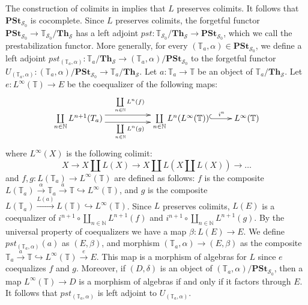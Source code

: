\documentclass[reqno]{amsart}
\theoremstyle{definition}
\theoremstyle{remark}
\newcommand{\cat}[1]{\mathbf{#1}}
\newcommand{\Th}{\cat{Th}}
\newcommand{\PSt}{\cat{PSt}}
\numberwithin{figure}{section}
\begin{document}
The construction of colimits in  implies that $L$ preserves colimits.
It follows that $\PSt_{\mathcal{S}_0}$ is cocomplete.
Since $L$ preserves colimits, the forgetful functor $\PSt_{\mathcal{S}_0} \to \mathbb{T}_{\mathcal{S}_0}/\Th_\mathcal{S}$
has a left adjoint $pst : \mathbb{T}_{\mathcal{S}_0}/\Th_\mathcal{S} \to \PSt_{\mathcal{S}_0}$, which we call the prestabilization functor.
More generally, for every $(\mathbb{T}_a,\alpha) \in \PSt_{\mathcal{S}_0}$,
we define a left adjoint $pst_{(\mathbb{T}_a,\alpha)} : \mathbb{T}_a/\Th_{\mathcal{S}} \to (\mathbb{T}_a,\alpha)/\PSt_{\mathcal{S}_0}$
to the forgetful functor $U_{(\mathbb{T}_a,\alpha)} : (\mathbb{T}_a,\alpha)/\PSt_{\mathcal{S}_0} \to \mathbb{T}_a/\Th_{\mathcal{S}}$.
Let $a : \mathbb{T}_a \to \mathbb{T}$ be an object of $\mathbb{T}_a/\Th_{\mathcal{S}}$.
Let $e : L^\infty(\mathbb{T}) \to E$ be the coequalizer of the following maps:
\[ \xymatrix{ \coprod\limits_{n \in \mathbb{N}} L^{n+1}(T_a) \ar@<+1ex>[rr]^{\coprod\limits_{n \in \mathbb{N}} L^n(f)} \ar@<-1ex>[rr]_{\coprod\limits_{n \in \mathbb{N}} L^n(g)}
    & & \coprod\limits_{n \in \mathbb{N}} L^n(L^\infty(\mathbb{T})) \ar@{^{(}->}[r]^-{i^n} & L^\infty(\mathbb{T}) } \]
where $L^\infty(X)$ is the following colimit:
\[ X \to X \amalg L(X) \to X \amalg L(X \amalg L(X)) \to \ldots \]
and $f,g : L(\mathbb{T}_a) \to L^\infty(\mathbb{T})$ are defined as follows:
$f$ is the composite $L(\mathbb{T}_a) \xrightarrow{\alpha} \mathbb{T}_a \xrightarrow{a} \mathbb{T} \hookrightarrow L^\infty(\mathbb{T})$,
and $g$ is the composite $L(\mathbb{T}_a) \xrightarrow{L(a)} L(\mathbb{T}) \hookrightarrow L^\infty(\mathbb{T})$.
Since $L$ preserves colimits, $L(E)$ is a coequalizer of $i^{n+1} \circ \coprod_{n \in \mathbb{N}} L^{n+1}(f)$ and $i^{n+1} \circ \coprod_{n \in \mathbb{N}} L^{n+1}(g)$.
By the universal property of coequalizers we have a map $\beta : L(E) \to E$.
We define $pst_{(\mathbb{T}_a,\alpha)}(a)$ as $(E,\beta)$, and morphism $(\mathbb{T}_a,\alpha) \to (E,\beta)$
as the composite $\mathbb{T}_a \xrightarrow{a} \mathbb{T} \hookrightarrow L^\infty(\mathbb{T}) \xrightarrow{e} E$.
This map is a morphism of algebras for $L$ since $e$ coequalizes $f$ and $g$.
Moreover, if $(D,\delta)$ is an object of $(\mathbb{T}_a,\alpha)/\PSt_{\mathcal{S}_0} $,
then a map $L^\infty(\mathbb{T}) \to D$ is a morphism of algebras if and only if it factors through $E$.
It follows that $pst_{(\mathbb{T}_a,\alpha)}$ is left adjoint to $U_{(\mathbb{T}_a,\alpha)}$.
\end{document}
